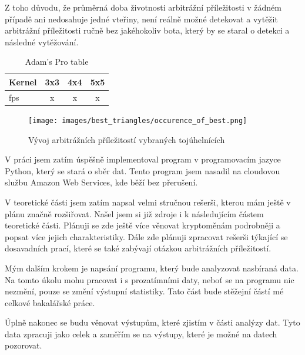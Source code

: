 \documentclass[thesis=B,czech]{FITthesis}[2019/03/21]
\begin{document}
Z toho důvodu, že průměrná doba životnosti arbitrážní příležitosti v žádném případě ani nedosahuje jedné vteřiny, není reálně možné detekovat a vytěžit arbitrážní příležitosti ručně bez jakéhokoliv bota, který by se staral o detekci a následné vytěžování. 

\begin{table}\centering
\caption{Adam's Pro table}
\label{table}
\begin{tabular}{| l || c | c | c |}
\hline Kernel & 3x3 & 4x4 & 5x5 \\ 
\hline fps & x & x & x\\ 
\hline
\end{tabular}
\end{table}

\begin{figure}\centering
	\texttt{[image: images/best\_triangles/occurence\_of\_best.png]}
	\caption{Vývoj arbitrážních příležitostí vybraných tojúhelnících }\label{occurence_of_best}
\end{figure}

\begin{conclusion}
V práci jsem zatím úspěšně implementoval program v programovacím jazyce Python, který se stará o sběr dat. Tento program jsem nasadil na cloudovou službu Amazon Web Services, kde běží bez přerušení. 

V teoretické části jsem zatím napsal velmi stručnou rešerši, kterou mám ještě v plánu značně rozšiřovat. Našel jsem si již zdroje i k následujícím částem teoretické části.  Plánuji se zde ještě více věnovat kryptoměnám podrobněji a popsat více jejich charakteristiky. Dále zde plánuji zpracovat rešerši týkající se dosavadních prací, které se také zabývají otázkou arbitrážních příležitostí.

Mým dalším krokem je napsání programu, který bude analyzovat nasbíraná data. Na tomto úkolu mohu pracovat i s prozatímními daty, neboť se na programu nic nezmění, pouze se změní výstupní statistiky. Tato část bude stěžejní částí mé celkové bakalářské práce.

Úplně nakonec se budu věnovat výstupům, které zjistím v části analýzy dat. Tyto data zpracuji jako celek a zaměřím se na výstupy, které je možné na datech pozorovat.


\end{conclusion}




\appendix
\end{document}
